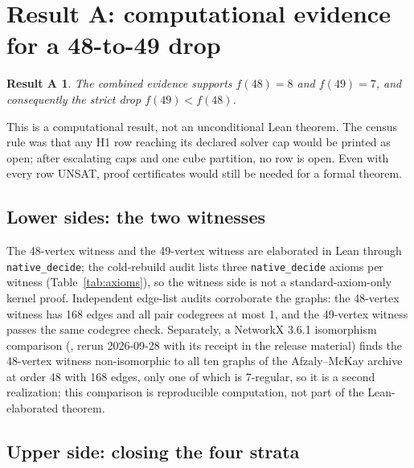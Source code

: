 \documentclass{anvil-paper}
\newtheorem*{resultA}{Result A}
\theoremstyle{definition}
\begin{document}
\section{Result A: computational evidence for a 48-to-49 drop}\label{sec:resultA}

\begin{resultA}
The combined evidence supports $f(48)=8$ and $f(49)=7$, and consequently the strict drop $f(49)<f(48)$.
\end{resultA}

This is a computational result, not an unconditional Lean theorem. The census rule was that any H1 row reaching its declared solver cap would be printed as open; after escalating caps and one cube partition, no row is open. Even with every row UNSAT, proof certificates would still be needed for a formal theorem.

\subsection{Lower sides: the two witnesses}\label{sec:lower}

The 48-vertex witness  and the 49-vertex witness  are elaborated in Lean through \texttt{native\_decide}; the cold-rebuild audit lists three \texttt{native\_decide} axioms per witness (Table~\ref{tab:axioms}), so the witness side is not a standard-axiom-only kernel proof. Independent edge-list audits corroborate the graphs: the 48-vertex witness has 168 edges and all pair codegrees at most 1, and the 49-vertex witness passes the same codegree check. Separately, a NetworkX 3.6.1 isomorphism comparison (, rerun 2026-09-28 with its receipt in the release material) finds the 48-vertex witness non-isomorphic to all ten graphs of the Afzaly--McKay archive \citep{afzaly-mckay-extremal} at order 48 with 168 edges, only one of which is 7-regular, so it is a second realization; this comparison is reproducible computation, not part of the Lean-elaborated theorem.

\subsection{Upper side: closing the four strata}\label{sec:upper}
\end{document}
